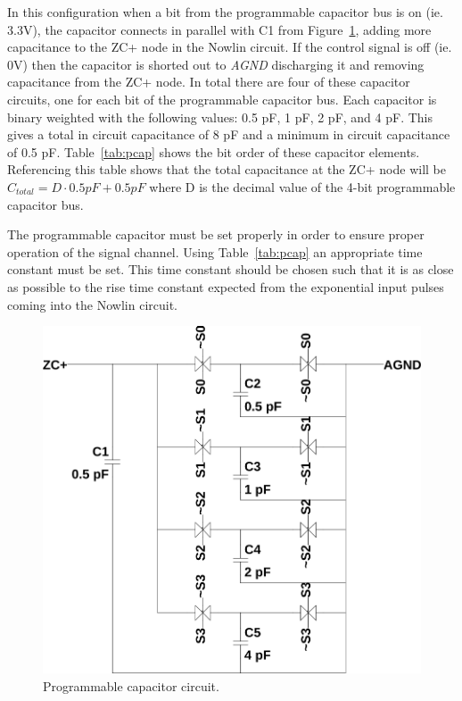 \documentclass[12pt,oneside,final]{siuethesis}
\theoremstyle{definition}
\begin{document}
\par In this configuration when a bit from the programmable capacitor bus is on (ie. 3.3V), the capacitor connects in parallel with C1 from Figure~\ref{fig:pcap}, adding more capacitance to the ZC+ node in the Nowlin circuit. If the control signal is off (ie. 0V) then the capacitor is shorted out to \emph{AGND} discharging it and removing capacitance from the ZC+ node. In total there are four of these capacitor circuits, one for each bit of the programmable capacitor bus. Each capacitor is binary weighted with the following values: 0.5 pF, 1 pF, 2 pF, and 4 pF. This gives a total in circuit capacitance of 8 pF and a minimum in circuit capacitance of 0.5 pF. Table~\ref{tab:pcap} shows the bit order of these capacitor elements. Referencing this table shows that the total capacitance at the ZC+ node will be $C_{total} = D \cdot 0.5 pF + 0.5 pF$ where D is the decimal value of the 4-bit programmable capacitor bus.
\par The programmable capacitor must be set properly in order to ensure proper operation of the signal channel. Using Table~\ref{tab:pcap} an appropriate time constant must be set. This time constant should be chosen such that it is as close as possible to the rise time constant expected from the exponential input pulses coming into the Nowlin circuit.
\begin{figure}[htbp!]
\centering
\includegraphics[scale=.4,keepaspectratio=true]{../LTspice_Drawings/nowlin/pcap.png} 
\caption{Programmable capacitor circuit.}
\label{fig:pcap}
\end{figure}
\end{document}
